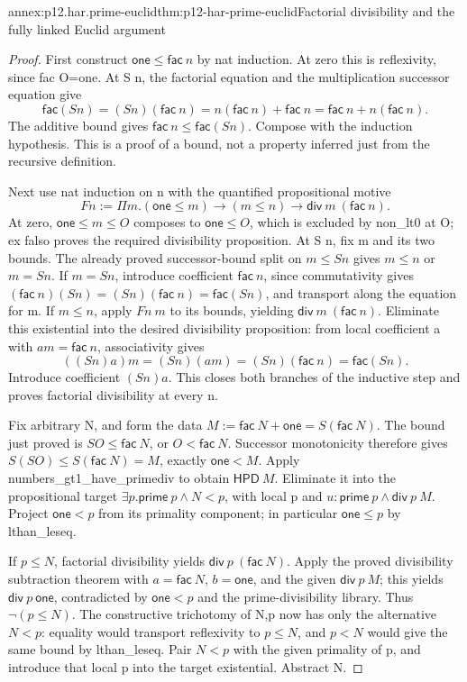 \begin{annexitem}{annex:p12.har.prime-euclid}{thm:p12-har-prime-euclid}{Factorial divisibility and the fully linked Euclid argument}
\begin{proof}
First construct \(\mathsf{one}\le\mathsf{fac}\ n\) by nat
induction. At zero this is reflexivity, since fac O=one.
At S n, the factorial equation and the multiplication successor
equation give
\[
 \mathsf{fac}(S n)=(S n)(\mathsf{fac}\ n)
       =n(\mathsf{fac}\ n)+\mathsf{fac}\ n
       =\mathsf{fac}\ n+n(\mathsf{fac}\ n).
\]
The additive bound gives \(\mathsf{fac}\ n\le\mathsf{fac}(S n)\).
Compose with the induction hypothesis. This is a proof of a bound,
not a property inferred just from the recursive definition.

Next use nat induction on n with the quantified propositional motive
\[
 F n:=\Pi m.(\mathsf{one}\le m)\to(m\le n)\to
                 \mathsf{div}\ m\ (\mathsf{fac}\ n).
\]
At zero, \(\mathsf{one}\le m\le O\) composes to
\(\mathsf{one}\le O\), which is excluded by non_lt0 at O;
ex falso proves the required divisibility proposition.
At S n, fix m and its two bounds. The already proved successor-bound
split on \(m\le S n\) gives \(m\le n\) or \(m=S n\).
If \(m=S n\), introduce coefficient \(\mathsf{fac}\ n\), since
commutativity gives
\((\mathsf{fac}\ n)(S n)=(S n)(\mathsf{fac}\ n)
=\mathsf{fac}(S n)\), and transport along the equation for m.
If \(m\le n\), apply \(F n\ m\) to its bounds, yielding
\(\mathsf{div}\ m\ (\mathsf{fac}\ n)\). Eliminate this
existential into the desired divisibility proposition: from local
coefficient a with \(am=\mathsf{fac}\ n\), associativity gives
\[
 ((S n)a)m=(S n)(am)=(S n)(\mathsf{fac}\ n)
                          =\mathsf{fac}(S n).
\]
Introduce coefficient \((S n)a\). This closes both branches of the
inductive step and proves factorial divisibility at every n.

Fix arbitrary N, and form the data
\(M:=\mathsf{fac}\ N+\mathsf{one}=S(\mathsf{fac}\ N)\).
The bound just proved is \(S O\le\mathsf{fac}\ N\), or
\(O<\mathsf{fac}\ N\). Successor monotonicity therefore gives
\(S(S O)\le S(\mathsf{fac}\ N)=M\), exactly
\(\mathsf{one}<M\). Apply numbers_gt1_have_primediv to obtain
\(\mathsf{HPD}\ M\). Eliminate it into the propositional target
\(\exists p.\mathsf{prime}\ p\wedge N<p\), with local p and
\(u:\mathsf{prime}\ p\wedge\mathsf{div}\ p\ M\).
Project \(\mathsf{one}<p\) from its primality component; in
particular \(\mathsf{one}\le p\) by lthan_leseq.

If \(p\le N\), factorial divisibility yields
\(\mathsf{div}\ p\ (\mathsf{fac}\ N)\). Apply the proved
divisibility subtraction theorem with
\(a=\mathsf{fac}\ N\), \(b=\mathsf{one}\), and the given
\(\mathsf{div}\ p\ M\); this yields
\(\mathsf{div}\ p\ \mathsf{one}\), contradicted by
\(\mathsf{one}<p\) and the prime-divisibility library.
Thus \(\neg(p\le N)\). The constructive trichotomy of N,p now
has only the alternative \(N<p\): equality would transport
reflexivity to \(p\le N\), and \(p<N\) would give the same
bound by lthan_leseq. Pair \(N<p\) with the given primality of p,
and introduce that local p into the target existential. Abstract N.


\end{proof}
\end{annexitem}
